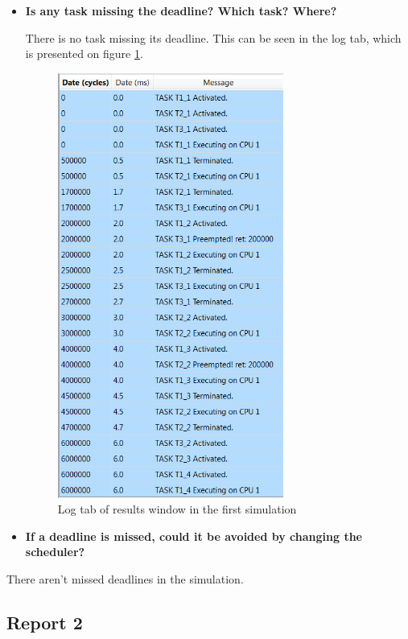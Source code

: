 \documentclass[12pt]{article}
\begin{document}
\begin{itemize}
\item \textbf{Is any task missing the deadline? Which task? Where?}

There is no task missing its deadline. This can be seen in the log tab, which is presented on figure \ref{alogtab}.

\begin{figure}[h]
\centering
\includegraphics[width=0.7\textwidth]{figures/A_log}   
\caption{Log tab of results window in the first simulation}
\label{alogtab}
\end{figure}
\FloatBarrier

\item \textbf{If a deadline is missed, could it be avoided by changing the scheduler?}
\end{itemize}

There aren't missed deadlines in the simulation.   
   
\subsection{Report 2}
\end{document}
